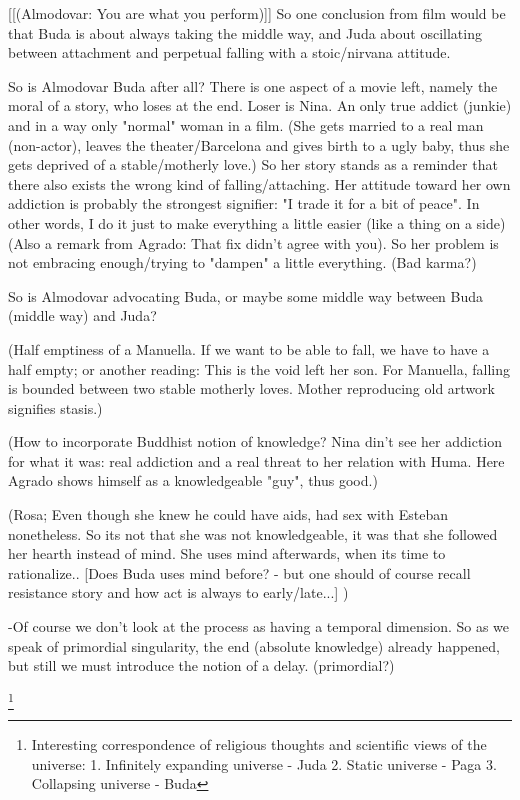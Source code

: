 \documentclass[10pt]{book}
\begin{document}
[[(Almodovar: You are what you perform)]]
So one conclusion from film would be that Buda is about always taking the middle way, and Juda about oscillating between attachment and perpetual falling with a stoic/nirvana attitude.

So is Almodovar Buda after all? There is one aspect of a movie left, namely the moral of a story, who loses at the end. Loser is Nina. An only true addict (junkie) and in a way only "normal" woman in a film. (She gets married to a real man (non-actor), leaves the theater/Barcelona and gives birth to a ugly baby, thus she gets deprived of a stable/motherly love.) So her story stands as a reminder that there also exists the wrong kind of falling/attaching. Her attitude toward her own addiction is probably the strongest signifier: "I trade it for a bit of peace". In other words, I do it just to make everything a little easier (like a thing on a side) (Also a remark from Agrado: That fix didn't agree with you). So her problem is not embracing enough/trying to "dampen" a little everything. (Bad karma?)

So is Almodovar advocating Buda, or maybe some middle way between Buda (middle way) and Juda?  

(Half emptiness of a Manuella. If we want to be able to fall, we have to have a half empty; or another reading: This is the void left her son.
For Manuella, falling is bounded between two stable motherly loves.
Mother reproducing old artwork signifies stasis.)

(How to incorporate Buddhist notion of knowledge? Nina din't see her addiction for what it was: real addiction and a real threat to her relation with Huma. Here Agrado shows himself as a knowledgeable "guy", thus good.)

(Rosa; Even though she knew he could have aids, had sex with Esteban nonetheless. So its not that she was not knowledgeable, it was that she followed her hearth instead of mind. She uses mind afterwards, when its time to rationalize.. [Does Buda uses mind before? - but one should of course recall resistance story and how act is always to early/late...] )


-Of course we don't look at the process as having a temporal dimension. So as we speak of primordial singularity, the end (absolute knowledge) already happened, but still we must introduce the notion of a delay. (primordial?) 

\footnote{
Interesting correspondence of religious thoughts and scientific views of the universe:
1. Infinitely expanding universe - Juda
2. Static universe - Paga
3. Collapsing universe - Buda
}
\end{document}
